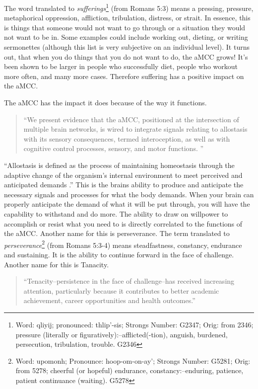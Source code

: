 \documentclass[9.5pt]{article}
\begin{document}
\begin{multicols}{2}
The word translated to \textit{sufferings}\footnote{Word: qliyij; pronounced: thlip'-sis; Strongs Number: G2347; Orig: from 2346; pressure (literally or figuratively):--afflicted(-tion), anguish, burdened, persecution, tribulation, trouble. G2346} (from Romans 5:3) means a pressing, pressure, metaphorical oppression, affliction, tribulation, distress, or strait. In essence, this is things that someone would not want to go through or a situation they would not want to be in. Some examples could include working out, dieting, or writing sermonettes (although this list is very subjective on an individual level). It turns out, that when you do things that you do not want to do, the aMCC grows! It's been shown to be larger in people who successfully diet, people who workout more often, and many more cases. Therefore suffering has a positive impact on the aMCC.

The aMCC has the impact it does because of the way it functions.

\begin{quotation}
``We present evidence that the aMCC, positioned at the intersection of multiple brain networks, is wired to integrate signals relating to allostasis with its sensory consequences, termed interoception, as well as with cognitive control processes, sensory, and motor functions. \cite{Allostasis}'' 
\end{quotation}

``Allostasis is defined as the process of maintaining homeostasis through the adaptive change of the organism's internal environment to meet perceived and anticipated demands \cite{Allostasis_defn}.'' This is the brains ability to produce and anticipate the necessary signals and processes for what the body demands. When your brain can properly anticipate the demand of what it will be put through, you will have the capability to withstand and do more. The ability to draw on willpower to accomplish or resist what you need to is directly correlated to the functions of the aMCC. Another name for this is perseverance. The term translated to \textit{perseverance}\footnote{Word: upomonh; Pronounce: hoop-om-on-ay'; Strongs Number: G5281; Orig: from 5278; cheerful (or hopeful) endurance, constancy:--enduring, patience, patient continuance (waiting). G5278} (from Romans 5:3-4) means steadfastness, constancy, endurance and sustaining. It is the ability to continue forward in the face of challenge. Another name for this is Tanacity.

\begin{quotation}
``Tenacity–persistence in the face of challenge–has received increasing attention, particularly because it contributes to better academic achievement, career opportunities and health outcomes.\cite{Tenacity}''
\end{quotation}


\end{multicols}
\end{document}
